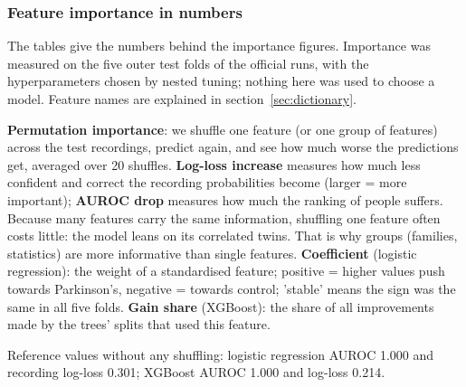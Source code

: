 \documentclass[11pt,a4paper]{article}
\begin{document}
\subsubsection{Feature importance in numbers}\label{sec:importance-tables}
The tables give the numbers behind the importance figures. Importance was measured on the five outer test folds of the official runs, with the hyperparameters chosen by nested tuning; nothing here was used to choose a model. Feature names are explained in section~\ref{sec:dictionary}.

\begin{tcolorbox}[colback=blue!3,colframe=blue!50!black,boxrule=0.5pt,arc=2pt,left=5pt,right=5pt,top=3pt,bottom=3pt,title={\small\bfseries What this tells us}]\small \textbf{Permutation importance}: we shuffle one feature (or one group of features) across the test recordings, predict again, and see how much worse the predictions get, averaged over 20 shuffles. \textbf{Log-loss increase} measures how much less confident and correct the recording probabilities become (larger = more important); \textbf{AUROC drop} measures how much the ranking of people suffers. Because many features carry the same information, shuffling one feature often costs little: the model leans on its correlated twins. That is why groups (families, statistics) are more informative than single features. \textbf{Coefficient} (logistic regression): the weight of a standardised feature; positive = higher values push towards Parkinson's, negative = towards control; 'stable' means the sign was the same in all five folds. \textbf{Gain share} (XGBoost): the share of all improvements made by the trees' splits that used this feature.\end{tcolorbox}
Reference values without any shuffling: logistic regression AUROC 1.000 and recording log-loss 0.301; XGBoost AUROC 1.000 and log-loss 0.214.
\end{document}
